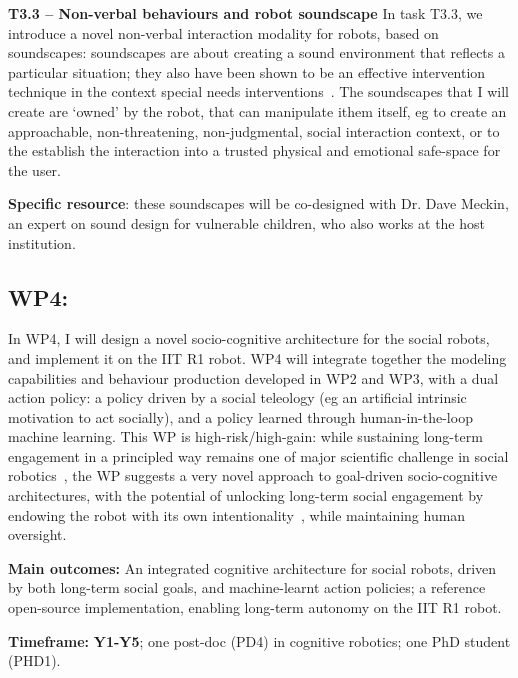 \textbf{T3.3 -- Non-verbal behaviours and robot soundscape} In task T3.3, we
introduce a novel non-verbal interaction modality for robots, based on
soundscapes: soundscapes are about creating a sound environment that reflects a
particular situation; they also have been shown to be an effective intervention
technique in the context special needs
interventions~\cite{greher2010soundscape}. The soundscapes that I will create
are `owned' by the robot, that can manipulate ithem itself, eg to create an
approachable, non-threatening, non-judgmental, social interaction context, or to
the establish the interaction into a trusted physical and emotional safe-space
for the user.

\textbf{Specific resource}: these soundscapes will be co-designed with Dr.
Dave Meckin, an expert on sound design for vulnerable children, who also works
at the host institution.

\subsection{WP4: \textbf{\wpFour}}

In WP4, I will design a novel socio-cognitive architecture for the social
robots, and implement it on the IIT R1 robot.  WP4 will integrate together the
modeling capabilities and behaviour production developed in WP2 and WP3, with a
dual action policy: a policy driven by a social teleology (eg an artificial
intrinsic motivation to act socially), and a policy learned through
human-in-the-loop machine learning. This WP is high-risk/high-gain: while sustaining
long-term engagement in a principled way remains one of major scientific
challenge in social robotics~\cite{hoffman2019anki}, the WP suggests a very novel
approach to goal-driven socio-cognitive architectures, with the potential of
unlocking long-term social engagement by endowing the robot with its own
intentionality~\cite{wiese2017robots}, while maintaining human oversight.

\begin{oframed}
    \textbf{Main outcomes:} An integrated cognitive architecture for social
    robots, driven by both long-term social goals, and machine-learnt action
    policies; a reference open-source implementation, enabling long-term
    autonomy on the IIT R1 robot.

    \textbf{Timeframe:} \textbf{Y1-Y5}; one post-doc (PD4) in cognitive
    robotics; one PhD student (PHD1).

\end{oframed}

